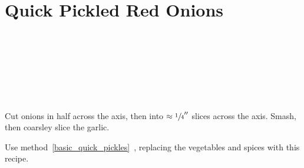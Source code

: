 \section[Pickled Red Onions]{Quick Pickled Red Onions}\label{pickled_red_onions}

\begin{ingredientcolumns}[1]
    \begin{ingredientblock}
        \\
        \\
        \\
        \\
        \\
        \\
    \end{ingredientblock}
\end{ingredientcolumns}

\begin{preparation}
\item Cut onions in half across the axis, then into $\approx\sfrac{1}{4}''$ slices across the axis.
    Smash, then coarsley slice the garlic.

\item Use method~\ref{basic_quick_pickles}~, replacing the vegetables and spices
    with this recipe.
\end{preparation}

\recipeend%
